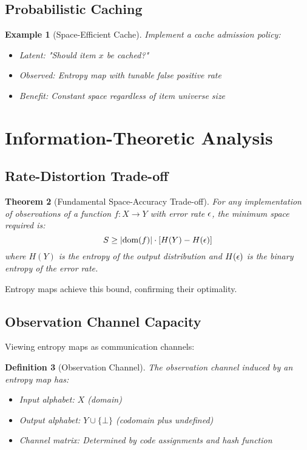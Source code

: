 \documentclass[11pt,final,hidelinks]{article}
\newtheorem{theorem}{Theorem}[section]
\newtheorem{definition}[theorem]{Definition}
\newtheorem{example}[theorem]{Example}
\begin{document}
\subsection{Probabilistic Caching}

\begin{example}[Space-Efficient Cache]
Implement a cache admission policy:
\begin{itemize}
    \item Latent: "Should item $x$ be cached?"
    \item Observed: Entropy map with tunable false positive rate
    \item Benefit: Constant space regardless of item universe size
\end{itemize}
\end{example}

\section{Information-Theoretic Analysis}

\subsection{Rate-Distortion Trade-off}

\begin{theorem}[Fundamental Space-Accuracy Trade-off]
For any implementation of observations of a function $f: X \to Y$ with error rate $\epsilon$, the minimum space required is:
\begin{equation}
S \geq \lvert\text{dom}(f)\rvert \cdot [H(Y) - H(\epsilon)]
\end{equation}
where $H(Y)$ is the entropy of the output distribution and $H(\epsilon)$ is the binary entropy of the error rate.
\end{theorem}

Entropy maps achieve this bound, confirming their optimality.

\subsection{Observation Channel Capacity}

Viewing entropy maps as communication channels:

\begin{definition}[Observation Channel]
The observation channel induced by an entropy map has:
\begin{itemize}
    \item Input alphabet: $X$ (domain)
    \item Output alphabet: $Y \cup \{\bot\}$ (codomain plus undefined)
    \item Channel matrix: Determined by code assignments and hash function
\end{itemize}
\end{definition}
\end{document}
